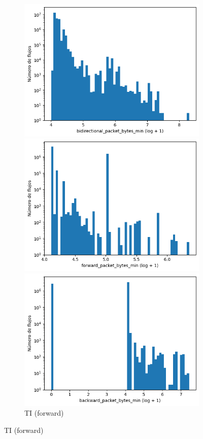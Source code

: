 \begin{figure}[H]
\begin{subfigure}[b]{0.26\textwidth}
        \includegraphics[width=\linewidth]{media/packet_pincer_toniot/bidirectional_packet_bytes_min_log_x_log_y.png}
        \caption{TI (bidir.)}
        \includegraphics[width=\textwidth]{media/packet_pincer_botiot/forward_packet_bytes_min_log_x_log_y.png}
        \caption{TI (forward)}
        \includegraphics[width=\textwidth]{media/packet_pincer_botiot/backward_packet_bytes_min_log_x_log_y.png}

\end{subfigure}
\end{figure}
